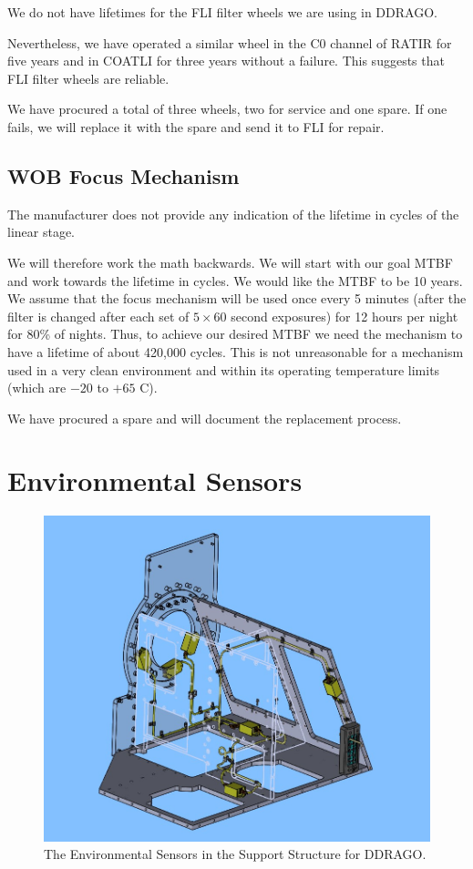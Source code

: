 \documentclass{report}
\begin{document}
We do not have lifetimes for the FLI filter wheels we are using in DDRAGO.

Nevertheless, we have operated a similar wheel in the C0 channel of RATIR for five years and in COATLI for three years without a failure. This suggests that FLI filter wheels are reliable.

We have procured a total of three wheels, two for service and one spare. If one fails, we will replace it with the spare and send it to FLI for repair.

\section{WOB Focus Mechanism}

The manufacturer does not provide any indication of the lifetime in cycles of the linear stage.

We will therefore work the math backwards. We will start with our goal MTBF and work towards the lifetime in cycles. We would like the MTBF to be 10 years. We assume that the focus mechanism will be used once every 5 minutes (after the filter is changed after each set of $5\times 60$ second exposures) for 12 hours per night for 80\% of nights. Thus, to achieve our desired MTBF we need the mechanism to have a lifetime of about 420,000 cycles. This is not unreasonable for a mechanism used in a very clean environment and within its operating temperature limits (which are $-20$ to $+65$ C).

We have procured a spare and will document the replacement process. 

\chapter{Environmental Sensors}


\begin{figure}
\begin{center}
\includegraphics[width=0.7\linewidth]{figures/3D-environmental_sensors.jpg}
\end{center}
\caption{The Environmental Sensors in the Support Structure for DDRAGO.}
\label{figure:enviro_sens}
\end{figure}
\end{document}
